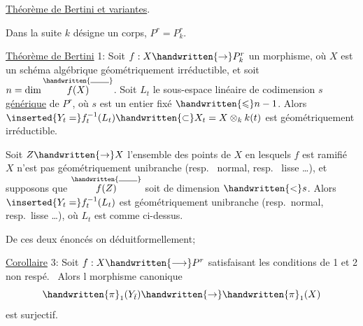 
\uline{Théorème de Bertini et variantes}.

Dans la suite $k$ désigne un corps, $P^r=P^r_k$.

\uline{Théorème de Bertini} 1: Soit $f:X\handwritten{\rightarrow}P^r_k$ un morphisme, où $X$ est un schéma algébrique géométriquement irréductible, et soit $n=\dim\overset{\handwritten{\rule{1.9em}{.4pt}}}{f(X)}$. Soit $L_t$ le sous-espace linéaire de codimension $s$ \uline{générique} de $P^r$, où $s$ est un entier fixé $\handwritten{\leqslant}n-1$. Alors $\inserted{Y_t=}f_t^{-1}(L_t)\handwritten{\subset}X_t=X\otimes_k k(t)$ est géométriquement irréductible.

  Soit $Z\handwritten{\rightarrow}X$  l'ensemble des points de $X$ en lesquels  $f$ est  ramifié   $X$ n'est pas géométriquement unibranche (resp.\  normal, resp.\  lisse \ldots),  et supposons que $\overset{\handwritten{\rule{1.9em}{.4pt}}}{f(Z)}$ soit de dimension $\handwritten{<}s$. Alors $\inserted{Y_t=}f_t^{-1}(L_t)$ est géométriquement unibranche (resp.\ normal, resp.\ lisse \ldots), où $L_t$ est comme ci-dessus.

De ces deux énoncés on déduit\handwritten{/}formellement;

\uline{Corollaire} 3: Soit $f:X\handwritten{\longrightarrow}P^r$ satisfaisant les conditions de 1\handwritten{,} et 2 non respé.\  Alors l morphisme canonique
\[
\handwritten{\pi}_1(Y_{\bar{t}})\handwritten{\rightarrow}\handwritten{\pi}_1(X)
\]
est surjectif.

